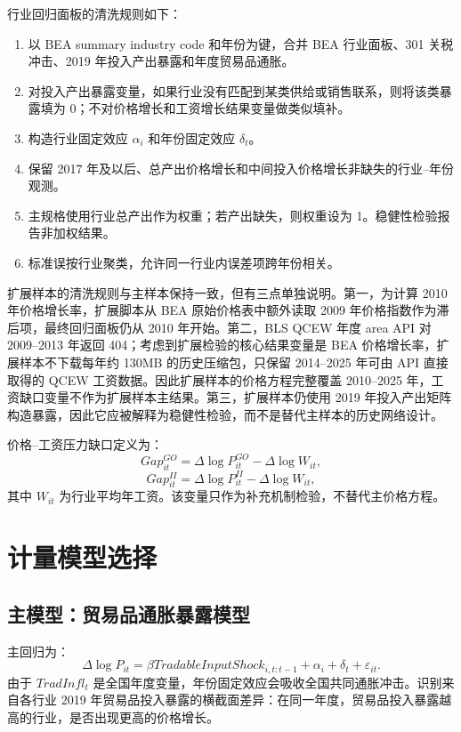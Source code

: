 \documentclass[12pt,a4paper,fontset=none]{ctexart}
\begin{document}
行业回归面板的清洗规则如下：
\begin{enumerate}
\item 以 BEA summary industry code 和年份为键，合并 BEA 行业面板、301 关税冲击、2019 年投入产出暴露和年度贸易品通胀。
\item 对投入产出暴露变量，如果行业没有匹配到某类供给或销售联系，则将该类暴露填为 0；不对价格增长和工资增长结果变量做类似填补。
\item 构造行业固定效应 \(\alpha_i\) 和年份固定效应 \(\delta_t\)。
\item 保留 2017 年及以后、总产出价格增长和中间投入价格增长非缺失的行业--年份观测。
\item 主规格使用行业总产出作为权重；若产出缺失，则权重设为 1。稳健性检验报告非加权结果。
\item 标准误按行业聚类，允许同一行业内误差项跨年份相关。
\end{enumerate}

扩展样本的清洗规则与主样本保持一致，但有三点单独说明。第一，为计算 2010 年价格增长率，扩展脚本从 BEA 原始价格表中额外读取 2009 年价格指数作为滞后项，最终回归面板仍从 2010 年开始。第二，BLS QCEW 年度 area API 对 2009--2013 年返回 404；考虑到扩展检验的核心结果变量是 BEA 价格增长率，扩展样本不下载每年约 130MB 的历史压缩包，只保留 2014--2025 年可由 API 直接取得的 QCEW 工资数据。因此扩展样本的价格方程完整覆盖 2010--2025 年，工资缺口变量不作为扩展样本主结果。第三，扩展样本仍使用 2019 年投入产出矩阵构造暴露，因此它应被解释为稳健性检验，而不是替代主样本的历史网络设计。

价格--工资压力缺口定义为：
\begin{equation}
Gap^{GO}_{it}
=\Delta\log P^{GO}_{it}-\Delta\log W_{it},
\end{equation}
\begin{equation}
Gap^{II}_{it}
=\Delta\log P^{II}_{it}-\Delta\log W_{it},
\end{equation}
其中 \(W_{it}\) 为行业平均年工资。该变量只作为补充机制检验，不替代主价格方程。

\section{计量模型选择}

\subsection{主模型：贸易品通胀暴露模型}

主回归为：
\begin{equation}
\Delta \log P_{it}
=\beta TradableInputShock_{i,t:t-1}
+\alpha_i+\delta_t+\varepsilon_{it}.
\end{equation}
由于 \(TradInfl_t\) 是全国年度变量，年份固定效应会吸收全国共同通胀冲击。识别来自各行业 2019 年贸易品投入暴露的横截面差异：在同一年度，贸易品投入暴露越高的行业，是否出现更高的价格增长。
\end{document}
